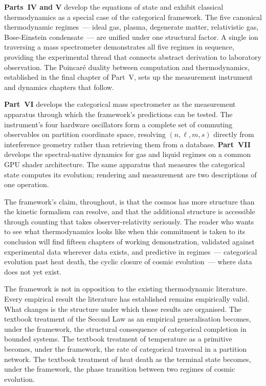 \textbf{Parts~IV and V} develop the equations of state and exhibit classical
thermodynamics as a special case of the categorical framework. The five canonical
thermodynamic regimes~--- ideal gas, plasma, degenerate matter, relativistic gas,
Bose-Einstein condensate~--- are unified under one structural factor. A single ion
traversing a mass spectrometer demonstrates all five regimes in sequence, providing
the experimental thread that connects abstract derivation to laboratory observation.
The Poincar\'e duality between computation and thermodynamics, established in the
final chapter of Part~V, sets up the measurement instrument and dynamics chapters
that follow.

\textbf{Part~VI} develops the categorical mass spectrometer as the measurement
apparatus through which the framework's predictions can be tested. The instrument's
four hardware oscillators form a complete set of commuting observables on partition
coordinate space, resolving $(n, \ell, m, s)$ directly from interference geometry
rather than retrieving them from a database. \textbf{Part~VII} develops the
spectral-native dynamics for gas and liquid regimes on a common GPU shader
architecture. The same apparatus that measures the categorical state computes its
evolution; rendering and measurement are two descriptions of one operation.

\medskip

The framework's claim, throughout, is that the cosmos has more structure than the
kinetic formalism can resolve, and that the additional structure is accessible through
counting that takes observer-relativity seriously. The reader who wants to see what
thermodynamics looks like when this commitment is taken to its conclusion will find
fifteen chapters of working demonstration, validated against experimental data wherever
data exists, and predictive in regimes~--- categorical evolution past heat death, the
cyclic closure of cosmic evolution~--- where data does not yet exist.

The framework is not in opposition to the existing thermodynamic literature. Every
empirical result the literature has established remains empirically valid. What changes
is the structure under which those results are organised. The textbook treatment of
the Second Law as an empirical generalisation becomes, under the framework, the
structural consequence of categorical completion in bounded systems. The textbook
treatment of temperature as a primitive becomes, under the framework, the rate of
categorical traversal in a partition network. The textbook treatment of heat death
as the terminal state becomes, under the framework, the phase transition between two
regimes of cosmic evolution.

